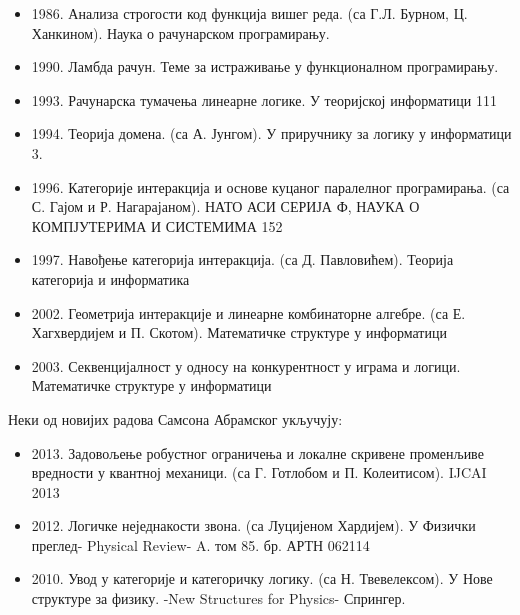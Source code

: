 \documentclass[a4paper]{article}
\begin{document}
\begin{itemize}
\item    1986. Анализа строгости код функција вишег реда. (са Г.Л. Бурном, Ц. Ханкином). Наука о рачунарском програмирању.
\item    1990. Ламбда рачун. Теме за истраживање у функционалном програмирању.
\item    1993. Рачунарска тумачења линеарне логике. У теоријској информатици 111
\item    1994. Теорија домена. (са А. Јунгом). У приручнику за логику у информатици 3.
\item    1996. Категорије интеракција и основе куцаног паралелног програмирања. (са С. Гајом и Р. Нагарајаном). НАТО АСИ СЕРИЈА Ф, НАУКА О КОМПЈУТЕРИМА И СИСТЕМИМА 152
\item    1997. Навођење категорија интеракција. (са Д. Павловићем). Теорија категорија и информатика
\item    2002. Геометрија интеракције и линеарне комбинаторне алгебре. (са Е. Хагхвердијем и П. Скотом). Математичке структуре у информатици

\item    2003. Секвенцијалност у односу на конкурентност у играма и логици. Математичке структуре у информатици 

\end{itemize}

Неки од новијих радова Самсона Абрамског укључују: 

\begin{itemize}

\item    2013. Задовољење робустног ограничења и локалне скривене променљиве вредности у квантној механици. (са Г. Готлобом и П. Колеитисом). IJCAI 2013
\item    2012. Логичке неједнакости звона. (са Луцијеном Хардијем). У Физички преглед-{ Physical Review}- A. том 85. бр. АРТН 062114
\item    2010. Увод у категорије и категоричку логику. (са Н. Твевелексом). У Нове структуре за физику. -{New Structures for Physics}- Спрингер.

\end{itemize}
\end{document}
